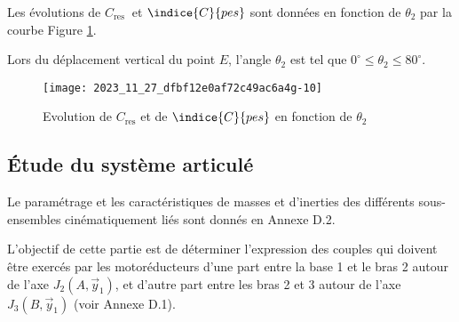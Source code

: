 \ifprof
\else

Les évolutions de $C_{\text {res }}$ et $\indice{C}{pes}$ sont données en fonction de $\theta_{2}$ par la courbe Figure \ref{fig:09}.

\begin{rem}
Lors du déplacement vertical du point $E$, l'angle $\theta_{2}$ est tel que $0^{\circ} \leq \theta_{2} \leq 80^{\circ}$.
\end{rem}

\begin{figure}[!h]
\centering
\texttt{[image: 2023\_11\_27\_dfbf12e0af72c49ac6a4g-10]}
\caption{Evolution de $C_{\text{res}}$ et de $\indice{C}{pes}$ en fonction de $\theta_{2}$ \label{fig:09}}
\end{figure}

\fi


\subsection{Étude du système articulé}
\ifprof
\else

Le paramétrage et les caractéristiques de masses et d'inerties des différents sous-ensembles cinématiquement liés sont donnés en Annexe D.2.

L'objectif de cette partie est de déterminer l'expression des couples qui doivent être exercés par les motoréducteurs d'une part entre la base 1 et le bras 2 autour de l'axe $J_{2}\left(A, \vec{y}_{1}\right)$, et d'autre part entre les bras 2 et 3 autour de l'axe $J_{3}\left(B, \vec{y}_{1}\right)$ (voir Annexe D.1).
\fi

